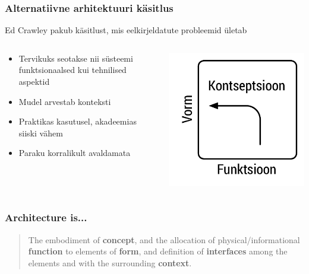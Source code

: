 \begin{frame}
	\frametitle{Alternatiivne arhitektuuri käsitlus}
	Ed Crawley pakub käsitlust, mis eelkirjeldatute probleemid ületab
	\begin{columns}[t]
		\begin{column}{6.8cm}
			\begin{itemize}
				\item Tervikuks seotakse nii süsteemi funktsionaalsed kui tehnilised aspektid 
				\item Mudel arvestab konteksti
				\item Praktikas kasutusel, akadeemias siiski vähem
				\item Paraku korralikult avaldamata
			\end{itemize}
		\end{column}
		\begin{column}[T]{3.2cm}
			\vfill
			\includegraphics[width=\textwidth]{ffc.pdf}
		\end{column}
	\end{columns}

\end{frame}


\begin{frame}[fragile]
  \frametitle{Architecture is...}
  		\begin{center}
			\begin{quote}
			The embodiment of \textbf{concept}, and the allocation of physical/informational \textbf{function} to elements of \textbf{form}, and definition of \textbf{interfaces} among the elements and with the surrounding \textbf{context}.
			\end{quote}
		\end{center}
	\cite{edcrawley} 
\end{frame}

